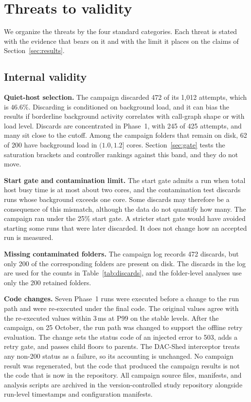 \section{Threats to validity}
\label{sec:threats}

We organize the threats by the four standard categories. Each threat is stated with the evidence that bears on it and with the limit it places on the claims of Section~\ref{sec:results}.

\subsection{Internal validity}

\textbf{Quiet-host selection.} The campaign discarded 472 of its 1{,}012 attempts, which is $46.6\%$. Discarding is conditioned on background load, and it can bias the results if borderline background activity correlates with call-graph shape or with load level. Discards are concentrated in Phase~1, with 245 of 425 attempts, and many sit close to the cutoff. Among the campaign folders that remain on disk, 62 of 200 have background load in $(1.0,1.2]$ cores. Section~\ref{sec:gate} tests the saturation brackets and controller rankings against this band, and they do not move.

\textbf{Start gate and contamination limit.} The start gate admits a run when total host busy time is at most about two cores, and the contamination test discards runs whose background exceeds one core. Some discards may therefore be a consequence of this mismatch, although the data do not quantify how many. The campaign ran under the 25\% start gate. A stricter start gate would have avoided starting some runs that were later discarded. It does not change how an accepted run is measured.

\textbf{Missing contaminated folders.} The campaign log records 472 discards, but only 200 of the corresponding folders are present on disk. The discards in the log are used for the counts in Table~\ref{tab:discards}, and the folder-level analyses use only the 200 retained folders.

\textbf{Code changes.} Seven Phase~1 runs were executed before a change to the run path and were re-executed under the final code. The original values agree with the re-executed values within 3\,ms at P99 on the stable levels. After the campaign, on 25 October, the run path was changed to support the offline retry evaluation. The change sets the status code of an injected error to 503, adds a retry gate, and passes child floors to parents. The DAC-Shed interceptor treats any non-200 status as a failure, so its accounting is unchanged. No campaign result was regenerated, but the code that produced the campaign results is not the code that is now in the repository. All campaign source files, manifests, and analysis scripts are archived in the version-controlled study repository alongside run-level timestamps and configuration manifests.


